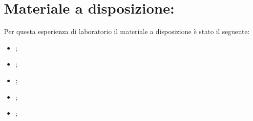 \section{Materiale a disposizione:}

Per questa esperienza di laboratorio il materiale a disposizione è stato il seguente:
\begin{itemize}
	\item{;}
    \item{;}
	\item{;}
	\item{;}
	\item{;}
\end{itemize}
